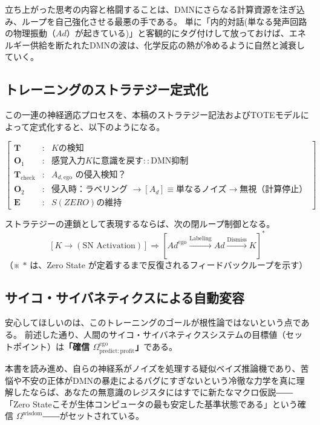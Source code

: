 立ち上がった思考の内容と格闘することは、DMNにさらなる計算資源を注ぎ込み、ループを自己強化させる最悪の手である。
単に「内的対話(単なる発声回路の物理振動（$Ad$）が起きている)」と客観的にタグ付けして放っておけば、エネルギー供給を断たれたDMNの波は、化学反応の熱が冷めるように自然と減衰していく。

\subsection{トレーニングのストラテジー定式化}

この一連の神経適応プロセスを、本稿のストラテジー記法およびTOTEモデルによって定式化すると、以下のようになる。

\begin{equation}
    \begin{bmatrix}
        \mathbf{T} & : & \text{$K$の検知} \\
        \mathbf{O}_1 & : & \text{感覚入力$K$に意識を戻す} :: \text{DMN抑制} \\
        \mathbf{T}_{\mathrm{check}} & : & A_{d,\mathrm{ego}} \text{ の侵入検知？} \\
        \mathbf{O}_2 & : & \text{侵入時：ラベリング } \to [A_d] \equiv \text{単なるノイズ} \to \text{無視（計算停止）} \\
        \mathbf{E} & : & \text{$S(ZERO)$の維持}
    \end{bmatrix}
\end{equation}

ストラテジーの連鎖として表現するならば、次の閉ループ制御となる。
\begin{equation}
    \left[ K \longrightarrow (\text{SN Activation}) \right] 
    \Longrightarrow 
    \left[ Ad^{\mathrm{ego}} \xrightarrow{\text{Labeling}} Ad \xrightarrow{\text{Dismiss}} K \right]^{*}
\end{equation}
（※ $*$ は、Zero State が定着するまで反復されるフィードバックループを示す）


\subsection{サイコ・サイバネティクスによる自動変容}

安心してほしいのは、このトレーニングのゴールが根性論ではないという点である。
前述した通り、人間のサイコ・サイバネティクスシステムの目標値（セットポイント）は\textbf{「確信 $\Omega^{\mathrm{ego}}_{\mathrm{predict:profit}}$」}である。

本書を読み進め、自らの神経系がノイズを処理する疑似ベイズ推論機であり、苦悩や不安の正体がDMNの暴走によるバグにすぎないという冷徹な力学を真に理解したならば、あなたの無意識のレジスタにはすでに新たなマクロ仮説――「Zero Stateこそが生体コンピュータの最も安定した基準状態である」という確信 $\Omega^{\mathrm{wisdom}}$――がセットされている。

